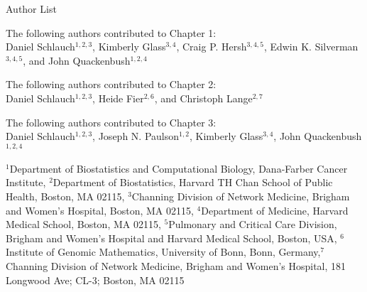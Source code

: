 
\begin{flushright} 
{\huge Author List}
\end{flushright} 
\noindent The following authors contributed to Chapter 1: \\
Daniel Schlauch$^{1,2,3}$, Kimberly Glass$^{3,4}$, Craig P. Hersh$^{3,4,5}$, Edwin K. Silverman$^{3,4,5}$, and John Quackenbush$^{1,2,4}$ \\


\vspace{1\baselineskip}

\noindent The following authors contributed to Chapter 2: \\
Daniel Schlauch$^{1,2,3}$, Heide Fier$^{2,6}$, and Christoph Lange$^{2,7}$\\


\vspace{1\baselineskip}


\noindent The following authors contributed to Chapter 3: \\
Daniel Schlauch$^{1,2,3}$, Joseph N. Paulson$^{1,2}$, Kimberly Glass$^{3,4}$, John Quackenbush$^{1,2,4}$\\

\vspace{1\baselineskip}

$^{1}$Department of Biostatistics and Computational Biology, Dana-Farber Cancer Institute, $^{2}$Department of Biostatistics, Harvard TH Chan School of Public Health, Boston, MA 02115, $^{3}$Channing Division of Network Medicine, Brigham and Women's Hospital, Boston, MA 02115, $^{4}$Department of Medicine, Harvard Medical School, Boston, MA 02115, $^{5}$Pulmonary and Critical Care Division, Brigham and Women's Hospital and Harvard Medical School, Boston, USA, $^{6}$Institute of Genomic Mathematics, University of Bonn, Bonn, Germany,$^{7}$Channing Division of Network Medicine,  Brigham and Women's Hospital, 181 Longwood Ave; CL-3; Boston, MA 02115 